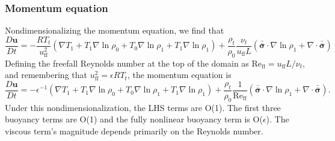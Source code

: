 \documentclass[aps, pre, onecolumn, nofootinbib, notitlepage, groupedaddress, amsfonts, amssymb, amsmath, longbibliography, superscriptaddress]{revtex4-1}
\newcommand{\grad}{\ensuremath{\nabla}}
\newcommand{\lilstressT}{\ensuremath{\bm{\bar{\bar{\sigma}}}}}
\begin{document}
\subsubsection{Momentum equation}
Nondimensionalizing the momentum equation, we find that
\begin{equation}
\frac{D \bm{u}}{D t} = -\frac{ R T_t }{u_{\text{ff}}^2}\left(\grad T_1 + T_1\grad\ln\rho_0 + T_0 \grad\ln\rho_1 + T_1\grad\ln\rho_1\right)
+ \frac{\rho_t}{\rho_0}\frac{\nu_t}{u_{\text{ff}} L} \left(\lilstressT\cdot\grad\ln\rho_1 + \grad\cdot\lilstressT\right)
\end{equation}
Defining the freefall Reynolds number at the top of the domain as $\text{Re}_{\text{ff}} = u_{\text{ff}} L / \nu_t$, and remembering that $u_{\text{ff}}^2 = \epsilon R T_t$, the momentum equation is
\begin{equation}
\frac{D \bm{u}}{D t} = -\epsilon^{-1}\left(\grad T_1 + T_1\grad\ln\rho_0 + T_0 \grad\ln\rho_1 + T_1\grad\ln\rho_1\right)
+ \frac{\rho_t}{\rho_0}\frac{1}{\text{Re}_{\text{ff}}} \left(\lilstressT\cdot\grad\ln\rho_1 + \grad\cdot\lilstressT\right).
\end{equation}
Under this nondimensionalization, the LHS terms are O(1).
The first three buoyancy terms are O(1) and the fully nonlinear buoyancy term is O($\epsilon$).
The viscous term's magnitude depends primarily on the Reynolds number.
\end{document}
